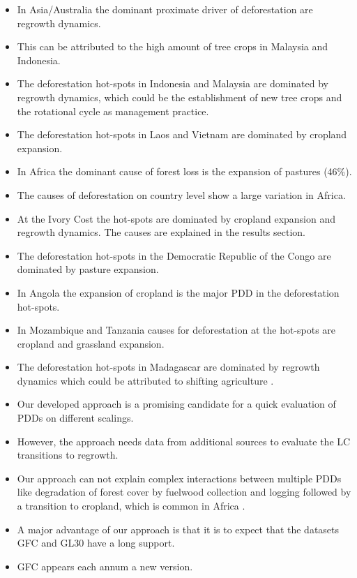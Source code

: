 			\begin{itemize}
				\item In Asia/Australia the dominant proximate driver of deforestation are regrowth dynamics.
				\item This can be attributed to the high amount of tree crops in Malaysia and Indonesia.
				\item The deforestation hot-spots in Indonesia and Malaysia are dominated by regrowth dynamics, which could be the establishment of new tree crops and the rotational cycle as management practice.
				\item The deforestation hot-spots in Laos and Vietnam are dominated by cropland expansion.
				\item In Africa the dominant cause of forest loss is the expansion of pastures (46\%).
				\item The causes of deforestation on country level show a large variation in Africa.
				\item At the Ivory Cost the hot-spots are dominated by cropland expansion and regrowth dynamics. The causes are explained in the results section.
				\item The deforestation hot-spots in the Democratic Republic of the Congo are dominated by pasture expansion.
				\item In Angola the expansion of cropland is the major \ac{PDD} in the deforestation hot-spots.
				\item In Mozambique and Tanzania causes for deforestation at the hot-spots are cropland and grassland expansion.
				\item The deforestation hot-spots in Madagascar are dominated by regrowth dynamics which could be attributed to shifting agriculture \citep{Curtis2018}.
				\item Our developed approach is a promising candidate for a quick evaluation of \acp{PDD} on different scalings.
				\item However, the approach needs data from additional sources to evaluate the \ac{LC} transitions to regrowth.
				\item Our approach can not explain complex interactions between multiple \acp{PDD} like degradation of forest cover by fuelwood collection and logging followed by a transition to cropland, which is common in Africa \citep{Geist2001,Cabral2011}.
				\item A major advantage of our approach is that it is to expect that the datasets \ac{GFC} and \ac{GL30} have a long support.
				\item \ac{GFC} appears each annum a new version.

\end{itemize}

